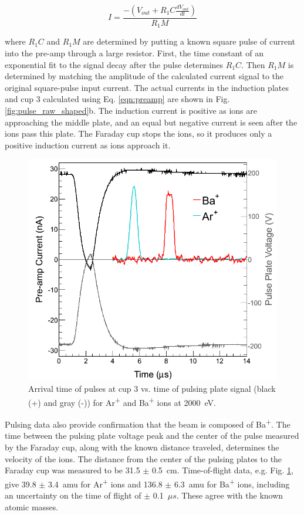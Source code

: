 \begin{equation}
I = \frac{-(V_{out} + R_{1} C \frac{dV_{out}}{dt})}{R_{1} M}
\label{eqn:preamp}
\end{equation}

\noindent
where $R_{1} C$ and $R_{1} M$ are determined by putting a known square pulse of current into the pre-amp through a large resistor.  First, the time constant of an exponential fit to the signal decay after the pulse determines $R_{1} C$.  Then $R_{1} M$ is determined by matching the amplitude of the calculated current signal to the original square-pulse input current.  The actual currents in the induction plates and cup 3 calculated using Eq. \ref{eqn:preamp} are shown in Fig. \ref{fig:pulse_raw_shaped}b.  The induction current is positive as ions are approaching the middle plate, and an equal but negative current is seen after the ions pass this plate.  The Faraday cup stops the ions, so it produces only a positive induction current as ions approach it.

\begin{figure}[h]
        \centering
                \includegraphics[width=.7\textwidth]{figures/pulses_BaAr.png}
                \caption{Arrival time of pulses at cup 3 vs. time of pulsing plate signal (black (+) and gray (-)) for Ar\textsuperscript{+} and Ba\textsuperscript{+} ions at 2000~eV.}
\label{fig:pulses_ArBa}
\end{figure}

Pulsing data also provide confirmation that the beam is composed of Ba\textsuperscript{+}.  The time between the pulsing plate voltage peak and the center of the pulse measured by the Faraday cup, along with the known distance traveled, determines the velocity of the ions.  The distance from the center of the pulsing plates to the Faraday cup was measured to be 31.5 $\pm$ 0.5~cm.  Time-of-flight data, e.g. Fig. \ref{fig:pulses_ArBa}, give 39.8 $\pm$ 3.4~amu for Ar\textsuperscript{+} ions and 136.8 $\pm$ 6.3~amu for Ba\textsuperscript{+} ions, including an uncertainty on the time of flight of $\pm$ 0.1~$\mu s$.  These agree with the known atomic masses.


